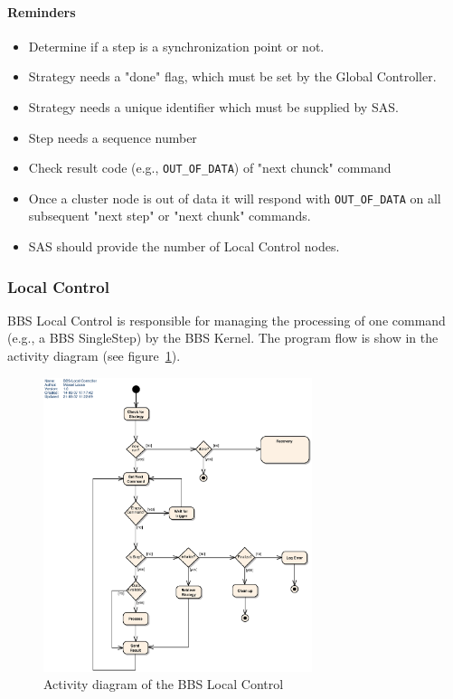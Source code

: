 \documentclass[10pt]{lofar}
\begin{document}
\paragraph*{Reminders} 
\begin{itemize}
\item Determine if a step is a synchronization point or not.
\item Strategy needs a "done" flag, which must be set by the Global Controller.
\item Strategy needs a unique identifier which must be supplied by SAS.
\item Step needs a sequence number
\item Check result code (e.g., \texttt{OUT\_OF\_DATA}) of "next chunck" command
\item Once a cluster node is out of data it will respond with
\texttt{OUT\_OF\_DATA} on all subsequent "next step" or "next chunk" commands.
\item SAS should provide the number of Local Control nodes.
\end{itemize}

\subsubsection{Local Control}
\label{subsubsec:design-local-control}
BBS Local Control is responsible for managing the processing of one command
(e.g., a BBS SingleStep) by the BBS Kernel. The program flow is show in the
activity diagram (see figure~\ref{fig:local-control-activity-diagram}).

\begin{figure}[!ht]
\centering
\includegraphics[width=0.7\textwidth]{images/bbs-local-control-activity-diagram}
\caption{Activity diagram of the BBS Local Control}
\label{fig:local-control-activity-diagram}
\end{figure}
\end{document}
